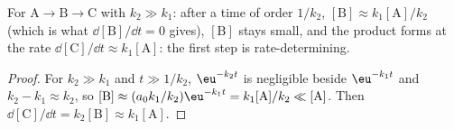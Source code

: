 \begin{proposition}\label{prop:b1:elementary-steps:qssa-justified}
For $\mathrm{A} \to \mathrm{B} \to \mathrm{C}$ with $k_2 \gg k_1$: after a
time of order $1/k_2$, $[\mathrm{B}] \approx k_1[\mathrm{A}]/k_2$ (which is
what $\dd[\mathrm{B}]/\dd t = 0$ gives), $[\mathrm{B}]$ stays small, and the
product forms at the rate $\dd[\mathrm{C}]/\dd t \approx k_1[\mathrm{A}]$:
the first step is rate-determining.
\end{proposition}

\begin{proof}
For $k_2 \gg k_1$ and $t \gg 1/k_2$, $\eu^{-k_2t}$ is negligible beside
$\eu^{-k_1t}$ and $k_2 - k_1 \approx k_2$, so $[\mathrm{B}] \approx (a_0k_1/k_2)
\eu^{-k_1t} = k_1[\mathrm{A}]/k_2 \ll [\mathrm{A}]$. Then
$\dd[\mathrm{C}]/\dd t = k_2[\mathrm{B}] \approx k_1[\mathrm{A}]$.
\end{proof}

